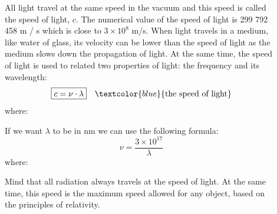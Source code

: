 \documentclass[main.tex]{subfiles}
\begin{document}
\begin{description}
\item[] 
All light travel at the same speed in the vacuum and this speed is called the speed of light, $c$. The numerical value of the speed of light is 299 792 458 m / s which is close to $3\times 10^8$ m/s. When light travels in a medium, like water of glass, its velocity can be lower than the speed of light as the medium slows down the propagation of light. At the same time, the speed of light is used to related two properties of light: the frequency and its wavelength:
\begin{equation*}
\boxed{  c=\nu\cdot \lambda  } \quad \textcolor{blue}{\text{the speed of light}}
\end{equation*}
where:


If we want $\lambda$ to be in nm we can use the following formula:
\begin{equation*}
\boxed{  \nu=\frac{3\times 10^{17}}{\lambda}  } 
\end{equation*}
where:
Mind that all radiation always travels at the speed of light. At the same time, this speed is the maximum speed allowed for any object, based on the principles of relativity.




\end{description}
\end{document}
